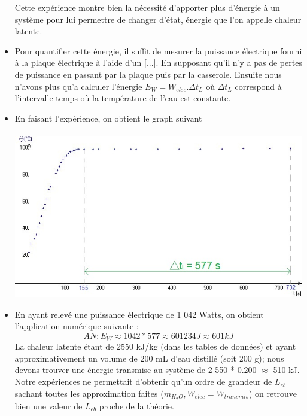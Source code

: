 \documentclass[12pt,a4paper]{article}
\begin{document}
\begin{itemize}
 Cette expérience montre bien la nécessité d'apporter plus d'énergie à un système pour lui permettre de changer d'état, énergie que l'on appelle chaleur latente.
 
 \item
 Pour quantifier cette énergie, il suffit de mesurer la puissance électrique fourni à la plaque électrique à l'aide d'un [...]. En supposant qu'il n'y a pas de pertes de puissance en passant par la plaque puis par la casserole. Ensuite nous n'avons plus qu'a calculer l'énergie $E_W = W_{elec}.\Delta t_L$  où $\Delta t_L$ correspond à l'intervalle temps  où la température de l'eau est constante.\\
 
 \item
 En faisant l'expérience, on obtient le graph suivant \\
 \\
 \includegraphics[scale=0.7]{graph2}\\
 
 \item
 En ayant relevé une puissance électrique de 1 042 Watts, on obtient l'application numérique suivante :
 $$ AN : E_W \approx 1042 * 577 \approx 601 234 J \approx 601 kJ$$
 La chaleur latente étant de 2550 kJ/kg (dans les tables de données) et ayant approximativement un volume de 200 mL d'eau distillé (soit 200 g); nous devons trouver une énergie transmise au système de 2 550 * 0.200 $\approx$ 510 kJ.\\
 
 Notre expériences ne permettait d'obtenir qu'un ordre de grandeur de $L_{eb}$ sachant toutes les approximation faites ($m_{H_2O},W_{elec}=W_{transmis}$) on retrouve bien une valeur de $L_{eb}$ proche de la théorie.  
 
 

 \end{itemize}
\end{document}
